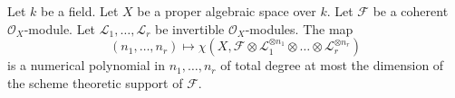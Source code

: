 %
\begin{lemma}
\label{lemma-numerical-polynomial-from-euler}
Let $k$ be a field. Let $X$ be a proper algebraic space over $k$.
Let $\mathcal{F}$ be a coherent $\mathcal{O}_X$-module. Let
$\mathcal{L}_1, \ldots, \mathcal{L}_r$ be invertible $\mathcal{O}_X$-modules.
The map
$$
(n_1, \ldots, n_r) \longmapsto
\chi(X, \mathcal{F} \otimes
\mathcal{L}_1^{\otimes n_1} \otimes \ldots \otimes
\mathcal{L}_r^{\otimes n_r})
$$
is a numerical polynomial in $n_1, \ldots, n_r$ of total degree at
most the dimension of the scheme theoretic support of $\mathcal{F}$.
\end{lemma}

